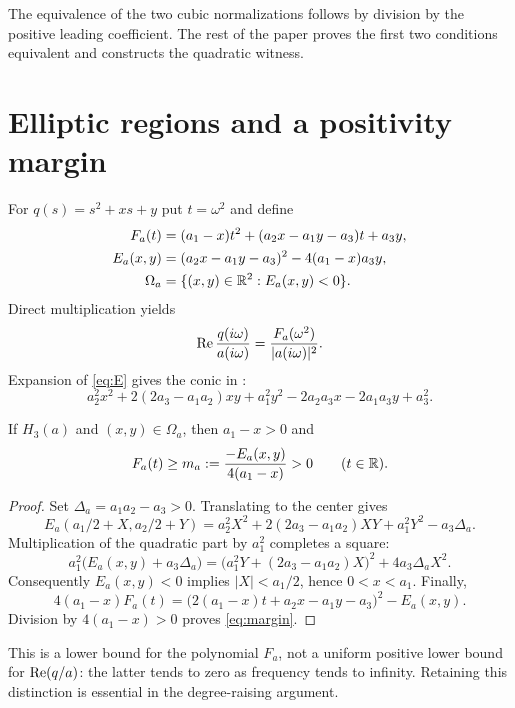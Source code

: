 \documentclass[11pt]{article}
\begin{document}
The equivalence of the two cubic normalizations follows by division by the positive leading coefficient. The rest of the paper proves the first two conditions equivalent and constructs the quadratic witness.

\section{Elliptic regions and a positivity margin}
For $q(s)=s^2+xs+y$ put $t=\omega^2$ and define
\begin{align}
 F_a(t)&=(a_1-x)t^2+(a_2x-a_1y-a_3)t+a_3y,\label{eq:F}\\
 E_a(x,y)&=(a_2x-a_1y-a_3)^2-4(a_1-x)a_3y,\label{eq:E}\\
 \Omega_a&=\{(x,y)\in\mathbb R^2:E_a(x,y)<0\}.
\end{align}
Direct multiplication yields
\begin{equation}\label{eq:freq}
 \operatorname{Re}\frac{q(i\omega)}{a(i\omega)}
 =\frac{F_a(\omega^2)}{|a(i\omega)|^2}.
\end{equation}
Expansion of \eqref{eq:E} gives the conic in \cite[Lemma~1]{yuHuang1999}:
\[
 a_2^2x^2+2(2a_3-a_1a_2)xy+a_1^2y^2
 -2a_2a_3x-2a_1a_3y+a_3^2.
\]

\begin{lemma}\label{lem:margin}
If $H_3(a)$ and $(x,y)\in\Omega_a$, then $a_1-x>0$ and
\begin{equation}\label{eq:margin}
 F_a(t)\ge m_a:=\frac{-E_a(x,y)}{4(a_1-x)}>0\qquad(t\in\mathbb R).
\end{equation}
\end{lemma}
\begin{proof}
Set $\Delta_a=a_1a_2-a_3>0$. Translating to the center gives
\[
 E_a(a_1/2+X,a_2/2+Y)
 =a_2^2X^2+2(2a_3-a_1a_2)XY+a_1^2Y^2-a_3\Delta_a.
\]
Multiplication of the quadratic part by $a_1^2$ completes a square:
\[
 a_1^2\bigl(E_a(x,y)+a_3\Delta_a\bigr)
 =\bigl(a_1^2Y+(2a_3-a_1a_2)X\bigr)^2
 +4a_3\Delta_a X^2.
\]
Consequently $E_a(x,y)<0$ implies $|X|<a_1/2$, hence $0<x<a_1$. Finally,
\[
 4(a_1-x)F_a(t)
 =\bigl(2(a_1-x)t+a_2x-a_1y-a_3\bigr)^2-E_a(x,y).
\]
Division by $4(a_1-x)>0$ proves \eqref{eq:margin}.
\end{proof}

This is a lower bound for the polynomial $F_a$, not a uniform positive lower bound for $\operatorname{Re}(q/a)$: the latter tends to zero as frequency tends to infinity. Retaining this distinction is essential in the degree-raising argument.
\end{document}
